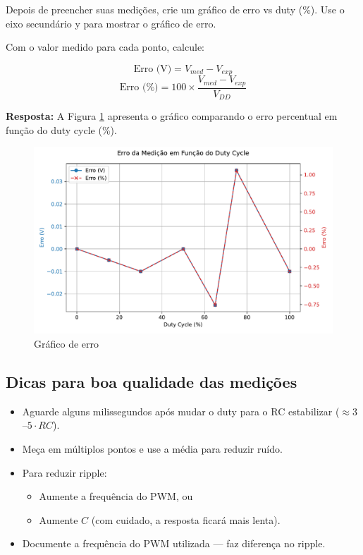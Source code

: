 \documentclass{article}
\begin{document}
\noindent
Depois de preencher suas medições, crie um gráfico de erro  vs duty (\%). Use o eixo secundário y para mostrar o gráfico de erro.

\noindent
Com o valor medido para cada ponto, calcule: 

\begin{equation}
    \text{Erro (V)} = V_{med} - V_{exp}
\end{equation}
\begin{equation}
    \text{Erro (\%)} = 100 \times \frac{V_{med} - V_{exp}}{V_{DD}}
\end{equation}

\noindent
\textbf{Resposta:} A Figura \ref{fig:graficodeerro} apresenta o gráfico comparando o erro percentual em função do duty cycle (\%).

\begin{figure}[ht!]
    \centering
    \includegraphics[width=0.9\linewidth]{erro_medição.pdf}
    \caption{Gráfico de erro}
    \label{fig:graficodeerro}
\end{figure}

\subsection{Dicas para boa qualidade das medições}

\begin{itemize}
    \item Aguarde alguns milissegundos após mudar o duty para o RC estabilizar ($\approx 3$--$5 \cdot RC$).
    \item Meça em múltiplos pontos e use a média para reduzir ruído.
    \item Para reduzir ripple:
    \begin{itemize}
        \item Aumente a frequência do PWM, ou
        \item Aumente $C$ (com cuidado, a resposta ficará mais lenta).
    \end{itemize}
    \item Documente a frequência do PWM utilizada — faz diferença no ripple.
\end{itemize}
\end{document}
